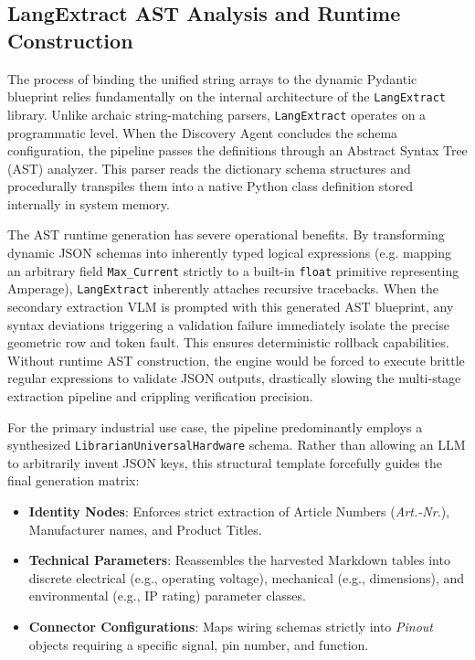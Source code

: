 \subsection{LangExtract AST Analysis and Runtime Construction}
\label{subsec:langextract_ast}

The process of binding the unified string arrays to the dynamic Pydantic blueprint relies fundamentally on the internal architecture of the \texttt{LangExtract} \citep{langextract} library. Unlike archaic string-matching parsers, \texttt{LangExtract} operates on a programmatic level. When the Discovery Agent concludes the schema configuration, the pipeline passes the definitions through an Abstract Syntax Tree (AST) analyzer. This parser reads the dictionary schema structures and procedurally transpiles them into a native Python class definition stored internally in system memory.

The AST runtime generation has severe operational benefits. By transforming dynamic JSON schemas into inherently typed logical expressions (e.g. mapping an arbitrary field \texttt{Max\_Current} strictly to a built-in \texttt{float} primitive representing Amperage), \texttt{LangExtract} inherently attaches recursive tracebacks. When the secondary extraction VLM is prompted with this generated AST blueprint, any syntax deviations triggering a validation failure immediately isolate the precise geometric row and token fault. This ensures deterministic rollback capabilities. Without runtime AST construction, the engine would be forced to execute brittle regular expressions to validate JSON outputs, drastically slowing the multi-stage extraction pipeline and crippling verification precision.

For the primary industrial use case, the pipeline predominantly employs a synthesized \texttt{LibrarianUniversalHardware} schema. Rather than allowing an LLM to arbitrarily invent JSON keys, this structural template forcefully guides the final generation matrix:
\begin{itemize}
    \item \textbf{Identity Nodes}: Enforces strict extraction of Article Numbers (\textit{Art.-Nr.}), Manufacturer names, and Product Titles.
    \item \textbf{Technical Parameters}: Reassembles the harvested Markdown tables into discrete electrical (e.g., operating voltage), mechanical (e.g., dimensions), and environmental (e.g., IP rating) parameter classes.
    \item \textbf{Connector Configurations}: Maps wiring schemas strictly into \textit{Pinout} objects requiring a specific signal, pin number, and function.
\end{itemize}

